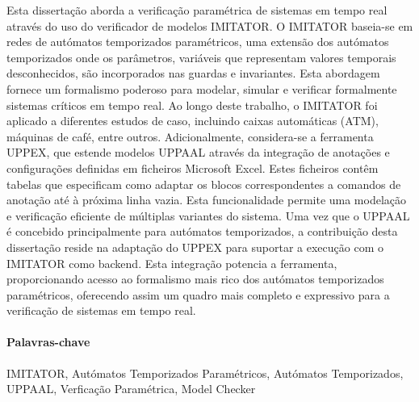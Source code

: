 
Esta dissertação aborda a verificação paramétrica de sistemas em tempo real através do uso do verificador de modelos IMITATOR. O IMITATOR baseia-se em redes de autómatos temporizados paramétricos, uma extensão dos autómatos temporizados onde os parâmetros, variáveis que representam valores temporais desconhecidos, são incorporados nas guardas e invariantes. Esta abordagem fornece um formalismo poderoso para modelar, simular e verificar formalmente sistemas críticos em tempo real. Ao longo deste trabalho, o IMITATOR foi aplicado a diferentes estudos de caso, incluindo caixas automáticas (ATM), máquinas de café, entre outros. Adicionalmente, considera-se a ferramenta UPPEX, que estende modelos UPPAAL através da integração de anotações e configurações definidas em ficheiros Microsoft Excel. Estes ficheiros contêm tabelas que especificam como adaptar os blocos correspondentes a comandos de anotação até à próxima linha vazia. Esta funcionalidade permite uma modelação e verificação eficiente de múltiplas variantes do sistema. Uma vez que o UPPAAL é concebido principalmente para autómatos temporizados, a contribuição desta dissertação reside na adaptação do UPPEX para suportar a execução com o IMITATOR como backend. Esta integração potencia a ferramenta, proporcionando acesso ao formalismo mais rico dos autómatos temporizados paramétricos, oferecendo assim um quadro mais completo e expressivo para a verificação de sistemas em tempo real.

\paragraph{Palavras-chave} IMITATOR, Autómatos Temporizados Paramétricos, Autómatos Temporizados, UPPAAL, Verficação Paramétrica, Model Checker 

\cleardoublepage

